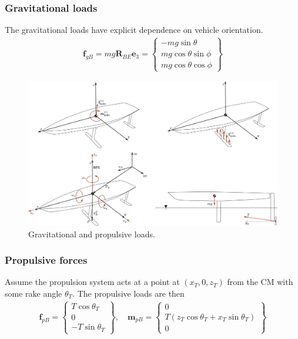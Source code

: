 \documentclass[10pt]{article}
\newcommand{\mbf}[1]{\mathbf{#1}}
\newcommand{\ben}{\begin{eqnarray*}}
\newcommand{\een}{\end{eqnarray*}}
\begin{document}
\subsubsection{Gravitational loads}
% 
The gravitational loads have explicit dependence on vehicle orientation.
\ben
\mbf{f}_{g B}= mg \mbf{R}_{BE} \mbf{e}_3 = \left\{\begin{array}{c}
    -m g \sin \theta          \\
    m g \cos \theta \sin \phi \\
    m g \cos \theta \cos \phi
\end{array}\right\}
\een
\begin{figure}[htb!]
    \centering
    \includegraphics[width=0.6\linewidth,clip,trim={37cm 0cm 0cm 30cm}]{SeakeepingDiagram.pdf}
    \caption{\label{fig:Loads}
        Gravitational and propulsive loads.
    }
\end{figure}

\subsubsection{Propulsive forces}
% 
Assume the propulsion system acts at a point at $(x_T,0,z_T)$ from the CM with some rake angle $\theta_T$.
The propulsive loads are then
\ben
\mbf{f}_{p B}=\left\{\begin{array}{c}
    T \cos \theta_T \\
    0               \\
    -T \sin \theta_T
\end{array}\right\},
\quad
\mbf{m}_{p B}=\left\{\begin{array}{c}
    0                                                 \\
    T\left(z_T \cos \theta_T+x_T \sin \theta_T\right) \\
    0
\end{array}\right\}
\een
% 
\end{document}
